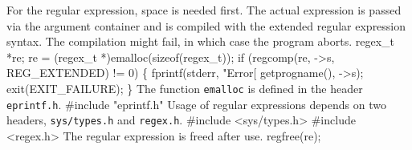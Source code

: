 For the regular expression, space is needed first. The actual
expression is passed via the argument container and is compiled with
the extended regular expression syntax. The compilation might fail, in
which case the program aborts.
\nwenddocs{}\endmoddef\nwstartdeflinemarkup{}\nwenddeflinemarkup
regex_t *re;
re = (regex_t *)emalloc(sizeof(regex_t));
if (regcomp(re, ->s, REG_EXTENDED) != 0) \{
  fprintf(stderr, "Error[%
            getprogname(), ->s);
  exit(EXIT_FAILURE);
\}
\nwendcode{}\nwdocspar
The function \texttt{emalloc} is defined in the header
\texttt{eprintf.h}.
\nwenddocs{}\plusendmoddef\nwstartdeflinemarkup{}\nwenddeflinemarkup
#include "eprintf.h"
\nwendcode{}\nwdocspar
Usage of regular expressions depends on two headers,
\texttt{sys/types.h} and \texttt{regex.h}.
\nwenddocs{}\plusendmoddef\nwstartdeflinemarkup{}\nwenddeflinemarkup
#include <sys/types.h>
#include <regex.h>
\nwendcode{}\nwdocspar
The regular expression is freed after use.
\nwenddocs{}\plusendmoddef\nwstartdeflinemarkup{}\nwenddeflinemarkup
regfree(re);
\nwendcode{}\nwdocspar
